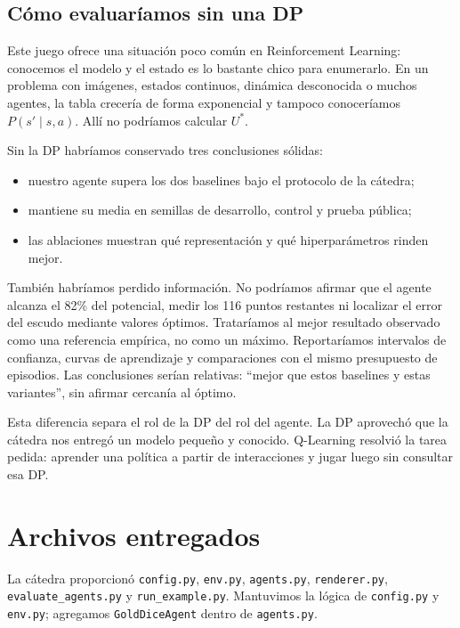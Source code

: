 \documentclass[10pt,a4paper]{article}
\begin{document}
\subsection{Cómo evaluaríamos sin una DP}

Este juego ofrece una situación poco común en Reinforcement Learning: conocemos el modelo y el estado es lo bastante chico para enumerarlo. En un problema con imágenes, estados continuos, dinámica desconocida o muchos agentes, la tabla crecería de forma exponencial y tampoco conoceríamos $P(s'\mid s,a)$. Allí no podríamos calcular $U^*$.

Sin la DP habríamos conservado tres conclusiones sólidas:

\begin{itemize}[leftmargin=17pt,itemsep=1pt,topsep=1pt]
    \item nuestro agente supera los dos baselines bajo el protocolo de la cátedra;
    \item mantiene su media en semillas de desarrollo, control y prueba pública;
    \item las ablaciones muestran qué representación y qué hiperparámetros rinden mejor.
\end{itemize}

También habríamos perdido información. No podríamos afirmar que el agente alcanza el 82\% del potencial, medir los 116 puntos restantes ni localizar el error del escudo mediante valores óptimos. Trataríamos al mejor resultado observado como una referencia empírica, no como un máximo. Reportaríamos intervalos de confianza, curvas de aprendizaje y comparaciones con el mismo presupuesto de episodios. Las conclusiones serían relativas: ``mejor que estos baselines y estas variantes'', sin afirmar cercanía al óptimo.

Esta diferencia separa el rol de la DP del rol del agente. La DP aprovechó que la cátedra nos entregó un modelo pequeño y conocido. Q-Learning resolvió la tarea pedida: aprender una política a partir de interacciones y jugar luego sin consultar esa DP.

\section{Archivos entregados}

La cátedra proporcionó \texttt{config.py}, \texttt{env.py}, \texttt{agents.py}, \texttt{renderer.py}, \texttt{evaluate\_agents.py} y \texttt{run\_example.py}. Mantuvimos la lógica de \texttt{config.py} y \texttt{env.py}; agregamos \texttt{GoldDiceAgent} dentro de \texttt{agents.py}.
\end{document}
